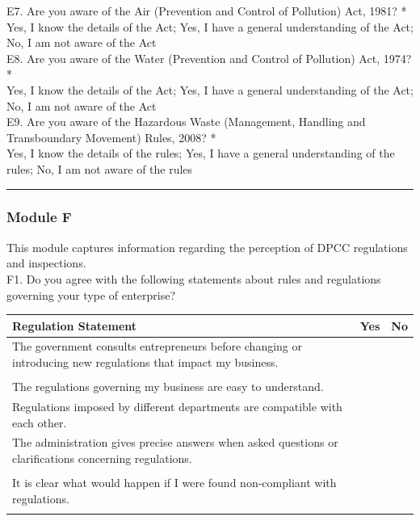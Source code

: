 \documentclass[a4paper, 12pt]{article}
\begin{document}
\begin{mdframed}[backgroundcolor=gray!20]
\begin{spacing}{0.5}
		{E7. Are you aware of the Air (Prevention and Control of Pollution) Act, 1981? *} \\
		
		Yes, I know the details of the Act; Yes, I have a general understanding of the Act; No, I am not aware of the Act \\
		
		{E8. Are you aware of the Water (Prevention and Control of Pollution) Act, 1974? *} \\
		
		Yes, I know the details of the Act; Yes, I have a general understanding of the Act; No, I am not aware of the Act \\
		
		{E9. Are you aware of the Hazardous Waste (Management, Handling and Transboundary Movement) Rules, 2008? *} \\
		
		Yes, I know the details of the rules; Yes, I have a general understanding of the rules; No, I am not aware of the rules \\
		
		\hrule 
		\subsubsection*{Module F}
		
		This module captures information regarding the perception of DPCC regulations and inspections.	\\
		
		F1. Do you agree with the following statements about rules and regulations governing your type of enterprise? \\
		
		
		
		
		\begin{tabular}{p{7.5cm}p{3cm}p{3cm}}
		\toprule
		Regulation Statement & Yes & No \\
		\midrule
		The government consults entrepreneurs before changing or introducing new regulations that impact my business. \\
&  & \\
The regulations governing my business are easy to understand. &  & \\
Regulations imposed by different departments are compatible with each other. &  & \\
The administration gives precise answers when asked questions or clarifications concerning regulations. \\
&  & \\
It is clear what would happen if I were found non-­compliant with regulations. &  & \\
 \bottomrule\\
		\end{tabular} \\ 


\end{spacing}
\end{mdframed}
\end{document}
